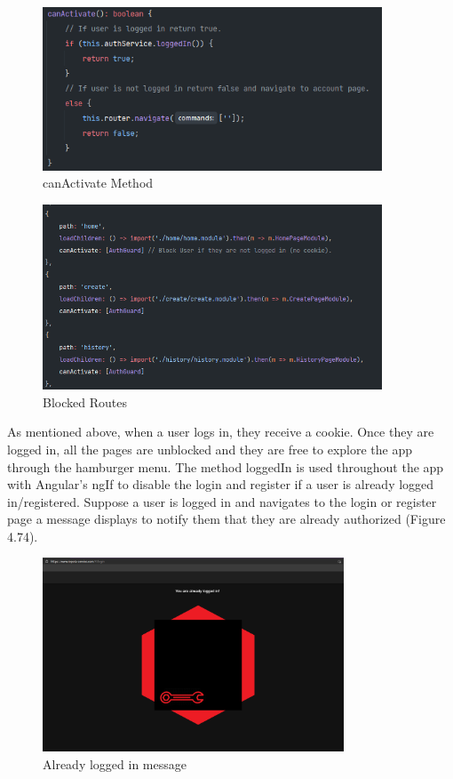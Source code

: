 \begin{figure}[H]
    \centering
    \caption{canActivate Method}
    \label{image:canActivate}
    \includegraphics[width=0.9\textwidth]{images/repota/auth_guard/can_activate.png}
\end{figure}

\begin{figure}[H]
    \centering
    \caption{Blocked Routes}
    \label{image:blocked}
    \includegraphics[width=0.9\textwidth]{images/repota/auth_guard/blocked_routes.png}
\end{figure}

As mentioned above, when a user logs in, they receive a cookie. Once they are logged in, all the pages are unblocked and they are free to explore the app through the hamburger menu. The method loggedIn is used throughout the app with Angular's ngIf to disable the login and register if a user is already logged in/registered. Suppose a user is logged in and navigates to the login or register page a message displays to notify them that they are already authorized (Figure 4.74). 

\begin{figure}[H]
    \centering
    \caption{Already logged in message}
    \label{image:alreadyLoggedIn}
    \includegraphics[width=0.8\textwidth]{images/repota/UI/already_loggedIn.png}
\end{figure}

